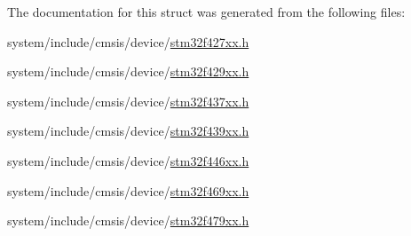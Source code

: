 The documentation for this struct was generated from the following files\+:\begin{DoxyCompactItemize}
\item 
system/include/cmsis/device/\hyperlink{stm32f427xx_8h}{stm32f427xx.\+h}\item 
system/include/cmsis/device/\hyperlink{stm32f429xx_8h}{stm32f429xx.\+h}\item 
system/include/cmsis/device/\hyperlink{stm32f437xx_8h}{stm32f437xx.\+h}\item 
system/include/cmsis/device/\hyperlink{stm32f439xx_8h}{stm32f439xx.\+h}\item 
system/include/cmsis/device/\hyperlink{stm32f446xx_8h}{stm32f446xx.\+h}\item 
system/include/cmsis/device/\hyperlink{stm32f469xx_8h}{stm32f469xx.\+h}\item 
system/include/cmsis/device/\hyperlink{stm32f479xx_8h}{stm32f479xx.\+h}\end{DoxyCompactItemize}
